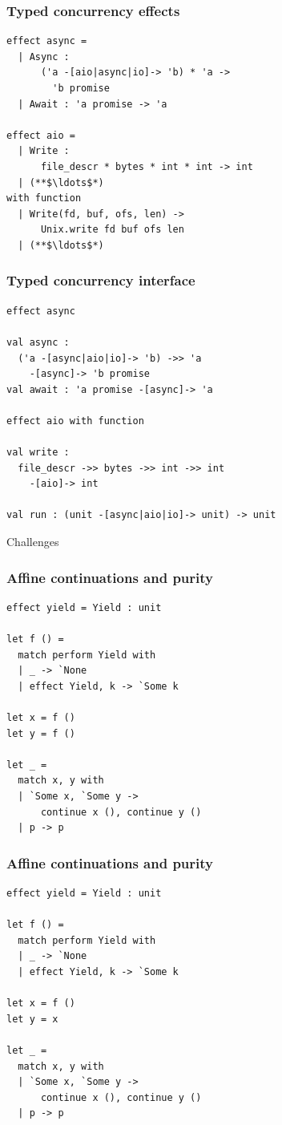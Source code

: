 \documentclass{beamer}
\begin{document}
\begin{frame}[fragile]
\frametitle{Typed concurrency effects}
\begin{lstlisting}[style=ocaml]
effect async =
  | Async :
      ('a -[aio|async|io]-> 'b) * 'a ->
        'b promise
  | Await : 'a promise -> 'a

effect aio =
  | Write :
      file_descr * bytes * int * int -> int
  | (**$\ldots$*)
with function
  | Write(fd, buf, ofs, len) ->
      Unix.write fd buf ofs len
  | (**$\ldots$*)
\end{lstlisting}
\end{frame}

\begin{frame}[fragile]
\frametitle{Typed concurrency interface}
\begin{lstlisting}[style=ocaml]
effect async

val async :
  ('a -[async|aio|io]-> 'b) ->> 'a
    -[async]-> 'b promise
val await : 'a promise -[async]-> 'a

effect aio with function

val write :
  file_descr ->> bytes ->> int ->> int
    -[aio]-> int

val run : (unit -[async|aio|io]-> unit) -> unit
\end{lstlisting}
\end{frame}

\begin{frame}[c]
\begin{center}
\Huge Challenges
\end{center}
\end{frame}

\begin{frame}[fragile]
\frametitle{Affine continuations and purity}
\begin{lstlisting}[style=ocaml]
effect yield = Yield : unit

let f () =
  match perform Yield with
  | _ -> `None
  | effect Yield, k -> `Some k

let x = f ()
let y = f ()

let _ =
  match x, y with
  | `Some x, `Some y ->
      continue x (), continue y ()
  | p -> p
\end{lstlisting}
\end{frame}

\begin{frame}[fragile]
\frametitle{Affine continuations and purity}
\begin{lstlisting}[style=ocaml]
effect yield = Yield : unit

let f () =
  match perform Yield with
  | _ -> `None
  | effect Yield, k -> `Some k

let x = f ()
let y = x

let _ =
  match x, y with
  | `Some x, `Some y ->
      continue x (), continue y ()
  | p -> p
\end{lstlisting}
\end{frame}
\end{document}
